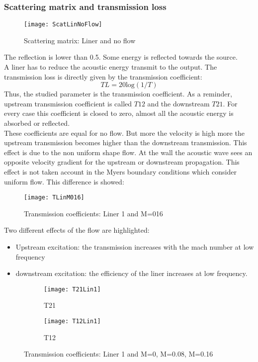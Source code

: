 \subsubsection{Scattering matrix and transmission loss}
\begin{figure}[H] \centering
    \texttt{[image: ScatLinNoFlow]}
    \caption{Scattering matrix: Liner and no flow}
\end{figure}
The reflection is lower than 0.5. Some energy is reflected towards the source.\\
A liner has to reduce the acoustic energy transmit to the output.
The transmission loss is directly given by the transmission coefficient:
\begin{equation}
    TL=20\text{log}(1/T)
\end{equation}
Thus, the studied parameter is the transmission coefficient. As a reminder, upstream transmission coefficient is called $T12$ and the downstream $T21$. For every case this coefficient is closed to zero, almost all the acoustic energy is absorbed or reflected.\\
These coefficients are equal for no flow. But more the velocity is high more the upstream transmission becomes higher than the downstream transmission. This effect is due to the non uniform shape flow. At the wall the acoustic wave sees an opposite velocity gradient for the upstream or downstream propagation. This effect is not taken account in the Myers boundary conditions which consider uniform flow. This difference is showed: 
\begin{figure}[H] \centering
    \texttt{[image: TLinM016]}
    \caption{Transmission coefficients: Liner 1 and M=016}
\end{figure}
Two different effects of the flow are highlighted:
\begin{itemize}
    \item Upstream excitation: the transmission increases with the mach number at low frequency
    \item downstream excitation: the efficiency of the liner increases at low frequency.
\end{itemize}
\begin{figure}[H] \centering
    \begin{subfigure}{.5\textwidth}\centering
     \texttt{[image: T21Lin1]}
    \caption{T21}
    \end{subfigure}%
    \begin{subfigure}{.5\textwidth}\centering
     \texttt{[image: T12Lin1]}
    \caption{T12}
    \end{subfigure}
    \caption{Transmission coefficients: Liner 1 and M=0, M=0.08, M=0.16}
\end{figure}

